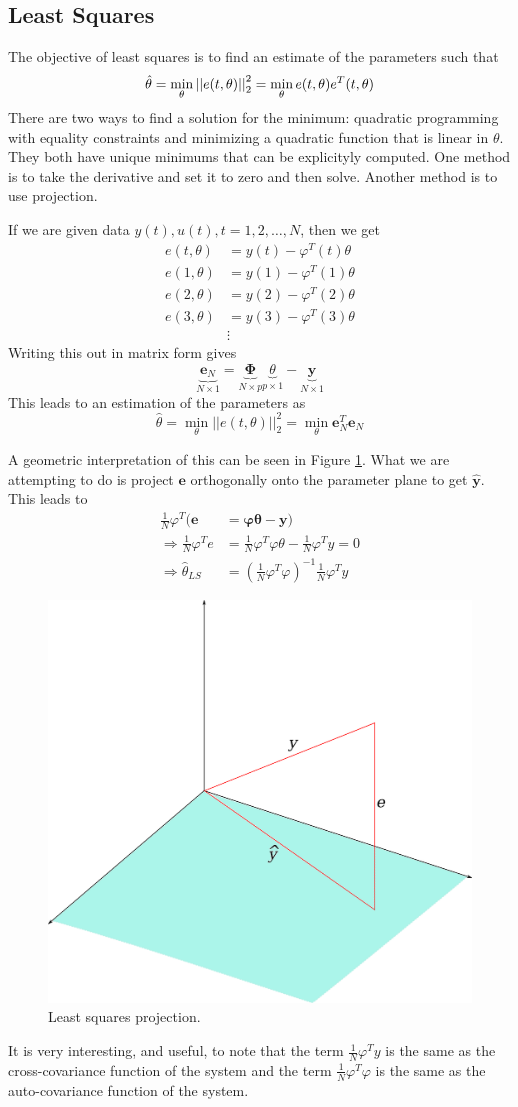 \documentclass[lecture,12pt,]{pcms-l}
\begin{document}
\subsection{Least Squares}
The objective of least squares is to find an estimate of the parameters such that
$$\hat{\theta} = \min_\theta\left|\left|e(t,\theta)\right|\right|_2^2 = \min_\theta e(t,\theta)e^T(t,\theta)$$
There are two ways to find a solution for the minimum: quadratic programming with equality constraints and minimizing a quadratic function that is linear in $\theta$. They both have unique minimums that can be explicityly computed. One method is to take the derivative and set it to zero and then solve. Another method is to use projection.

If we are given data $y(t),u(t),t=1,2,\ldots,N$, then we get
\begin{align*}
e(t,\theta) &= y(t) - \varphi^T(t)\theta \\
e(1,\theta) &= y(1) - \varphi^T(1)\theta \\
e(2,\theta) &= y(2) - \varphi^T(2)\theta \\
e(3,\theta) &= y(3) - \varphi^T(3)\theta \\
&\vdots
\end{align*}
Writing this out in matrix form gives
$$\underbrace{\mathbf{e}_N}_{N\times 1} = \underbrace{\mathbf{\Phi}}_{N\times p}\underbrace{\theta}_{p\times 1} - \underbrace{\mathbf{y}}_{N\times 1}$$
This leads to an estimation of the parameters as
$$\hat{\theta} = \min_\theta ||e(t,\theta)||_2^2 = \min_\theta \mathbf{e}_N^T\mathbf{e}_N$$

A geometric interpretation of this can be seen in Figure \ref{fig:07ls}. What we are attempting to do is project $\mathbf{e}$ orthogonally onto the parameter plane to get $\hat{\mathbf{y}}$. This leads to
\begin{align*}
\frac{1}{N}\varphi^T(\mathbf{e} &= \mathbf{\varphi}\mathbf{\theta} - \mathbf{y}) \\
\Rightarrow \frac{1}{N}\varphi^Te &= \frac{1}{N}\varphi^T\varphi\theta - \frac{1}{N}\varphi^Ty = 0 \\
\Rightarrow \hat{\theta}_{LS} &= (\frac{1}{N}\varphi^T\varphi)^{-1}\frac{1}{N}\varphi^Ty
\end{align*}

\begin{figure}[ht!]
  \centering
  \includegraphics[width=.4\textwidth]{images/07ls}
  \caption{Least squares projection.}
  \label{fig:07ls}
\end{figure}

It is very interesting, and useful, to note that the term $\frac{1}{N}\varphi^Ty$ is the same as the cross-covariance function of the system and the term $\frac{1}{N}\varphi^T\varphi$ is the same as the auto-covariance function of the system.
\end{document}
